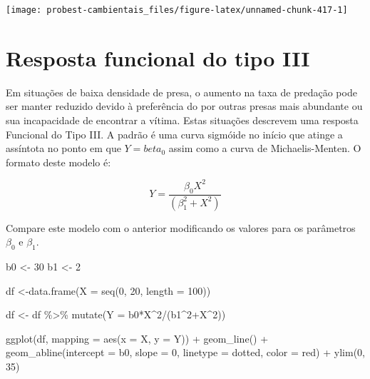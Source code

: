 \documentclass[
]{book}
\newenvironment{Shaded}{\begin{snugshade}}{\end{snugshade}}
\newcommand{\AttributeTok}[1]{\textcolor[rgb]{0.77,0.63,0.00}{#1}}
\newcommand{\DecValTok}[1]{\textcolor[rgb]{0.00,0.00,0.81}{#1}}
\newcommand{\FunctionTok}[1]{\textcolor[rgb]{0.00,0.00,0.00}{#1}}
\newcommand{\NormalTok}[1]{#1}
\newcommand{\OtherTok}[1]{\textcolor[rgb]{0.56,0.35,0.01}{#1}}
\newcommand{\SpecialCharTok}[1]{\textcolor[rgb]{0.00,0.00,0.00}{#1}}
\newcommand{\StringTok}[1]{\textcolor[rgb]{0.31,0.60,0.02}{#1}}
\begin{document}
\begin{center}\texttt{[image: probest-cambientais\_files/figure-latex/unnamed-chunk-417-1]} \end{center}

\hypertarget{resposta-funcional-do-tipo-iii}{%
\section{Resposta funcional do tipo III}\label{resposta-funcional-do-tipo-iii}}

Em situações de baixa densidade de presa, o aumento na taxa de predação pode ser manter reduzido devido à preferência do por outras presas mais abundante ou sua incapacidade de encontrar a vítima. Estas situações descrevem uma resposta Funcional do Tipo III. A padrão é uma curva sigmóide no início que atinge a assíntota no ponto em que \(Y = beta_0\) assim como a curva de Michaelis-Menten. O formato deste modelo é:

\[Y = \frac{\beta_0 X^2}{(\beta_1^2 + X^2)}\]

Compare este modelo com o anterior modificando os valores para os parâmetros \(\beta_0\) e \(\beta_1\).

\begin{Shaded}
\begin{Highlighting}[]
\NormalTok{b0 }\OtherTok{\textless{}{-}} \DecValTok{30}
\NormalTok{b1 }\OtherTok{\textless{}{-}} \DecValTok{2}

\NormalTok{df }\OtherTok{\textless{}{-}}\FunctionTok{data.frame}\NormalTok{(}\AttributeTok{X =} \FunctionTok{seq}\NormalTok{(}\DecValTok{0}\NormalTok{, }\DecValTok{20}\NormalTok{, }\AttributeTok{length =} \DecValTok{100}\NormalTok{))}

\NormalTok{df }\OtherTok{\textless{}{-}}\NormalTok{ df }\SpecialCharTok{\%\textgreater{}\%} \FunctionTok{mutate}\NormalTok{(}\AttributeTok{Y =}\NormalTok{ b0}\SpecialCharTok{*}\NormalTok{X}\SpecialCharTok{\^{}}\DecValTok{2}\SpecialCharTok{/}\NormalTok{(b1}\SpecialCharTok{\^{}}\DecValTok{2}\SpecialCharTok{+}\NormalTok{X}\SpecialCharTok{\^{}}\DecValTok{2}\NormalTok{))}

\FunctionTok{ggplot}\NormalTok{(df, }\AttributeTok{mapping =} \FunctionTok{aes}\NormalTok{(}\AttributeTok{x =}\NormalTok{ X, }\AttributeTok{y =}\NormalTok{ Y)) }\SpecialCharTok{+}
  \FunctionTok{geom\_line}\NormalTok{() }\SpecialCharTok{+}
  \FunctionTok{geom\_abline}\NormalTok{(}\AttributeTok{intercept =}\NormalTok{ b0, }\AttributeTok{slope =} \DecValTok{0}\NormalTok{, }\AttributeTok{linetype =} \StringTok{\textquotesingle{}dotted\textquotesingle{}}\NormalTok{, }\AttributeTok{color =} \StringTok{\textquotesingle{}red\textquotesingle{}}\NormalTok{) }\SpecialCharTok{+}
  \FunctionTok{ylim}\NormalTok{(}\DecValTok{0}\NormalTok{, }\DecValTok{35}\NormalTok{)}
\end{Highlighting}
\end{Shaded}
\end{document}

